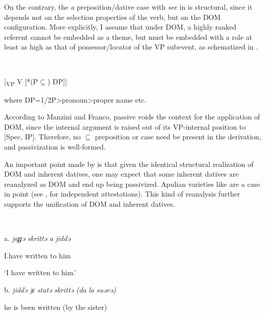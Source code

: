 \documentclass[output=paper]{langscibook}
\begin{document}
On the contrary, the \textit{a} preposition/dative case with \textit{see} in  is structural, since it depends not on the selection properties of the verb, but on the DOM configuration. More explicitly, I assume that under DOM, a highly ranked referent cannot be embedded as a theme, but must be embedded with a role at least as high as that of possessor/locator of the VP subevent, as schematized in . 

\ea\label{ex:key:}
{} \\
\z

[\textsubscript{VP} V   [*(P${\subseteq}$) DP]]    


where DP=1/2P>pronoun>proper name etc.

According to Manzini and Franco, passive voids the context for the application of DOM, since the internal argument is raised out of its VP-internal position to [Spec, IP]. Therefore, no ${\subseteq}$ preposition or case need be present in the derivation, and passivization is well-formed.  

An important point made by \citet{Pineda2016} is that given the identical structural realization of DOM and inherent datives, one may expect that some inherent datives are reanalyzed as DOM and end up being passivized. Apulian varieties like  are a case in point (see \citealt{Loporcaro1988}, \citealt{Ledgeway2000} for independent attestations). This kind of reanalysis further supports the unification of DOM and inherent datives.  

\ea\label{ex:key:}
{}\\
\z

a.  \textit{jaɟɟə}   \textit{skrittə}   \textit{a} \textit{jiddə}



  I.have  written  to him


  ‘I have written to him.’


  b.  \textit{jiddə}   \textit{jɛ}   \textit{statə}   \textit{skrittə}   \textit{(da} \textit{la} \textit{suərə)}



  he  is  been   written (by the sister)
\end{document}
